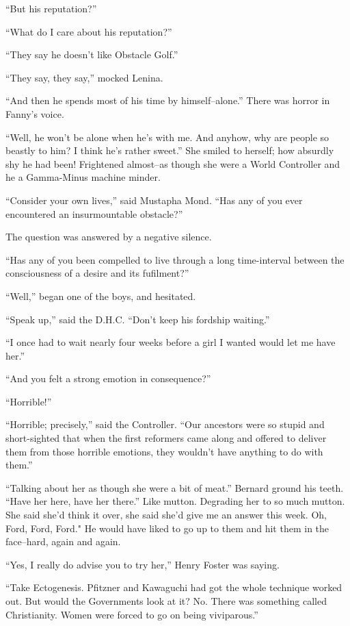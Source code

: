 \documentclass[12pt]{report}
\begin{document}
``But his reputation?''

``What do I care about his reputation?''

``They say he doesn't like Obstacle Golf.''

``They say, they say,'' mocked Lenina.

``And then he spends most of his time by himself--alone.'' There was
horror in Fanny's voice.

``Well, he won't be alone when he's with me. And anyhow, why are people
so beastly to him? I think he's rather sweet.'' She smiled to herself;
how absurdly shy he had been! Frightened almost--as though she were a
World Controller and he a Gamma-Minus machine minder.

``Consider your own lives,'' said Mustapha Mond. ``Has any of you ever
encountered an insurmountable obstacle?''

The question was answered by a negative silence.

``Has any of you been compelled to live through a long time-interval
between the consciousness of a desire and its fufilment?''

``Well,'' began one of the boys, and hesitated.

``Speak up,'' said the D.H.C. ``Don't keep his fordship waiting.''

``I once had to wait nearly four weeks before a girl I wanted would let
me have her.''

``And you felt a strong emotion in consequence?''

``Horrible!''

``Horrible; precisely,'' said the Controller. ``Our ancestors were so
stupid and short-sighted that when the first reformers came along and
offered to deliver them from those horrible emotions, they wouldn't have
anything to do with them.''

``Talking about her as though she were a bit of meat.'' Bernard ground
his teeth. ``Have her here, have her there.'' Like mutton. Degrading her
to so much mutton. She said she'd think it over, she said she'd give me
an answer this week. Oh, Ford, Ford, Ford." He would have liked to go up
to them and hit them in the face--hard, again and again.

``Yes, I really do advise you to try her,'' Henry Foster was saying.

``Take Ectogenesis. Pfitzner and Kawaguchi had got the whole technique
worked out. But would the Governments look at it? No. There was
something called Christianity. Women were forced to go on being
viviparous.''
\end{document}
